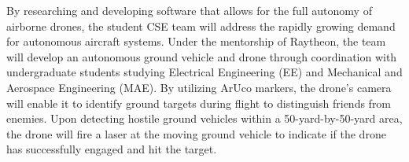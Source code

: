 
By researching and developing software that allows for the full autonomy of airborne drones, the student CSE team will address the rapidly growing demand for autonomous aircraft systems. Under the mentorship of Raytheon, the team will develop an autonomous ground vehicle and drone through coordination with undergraduate students studying Electrical Engineering (EE) and Mechanical and Aerospace Engineering (MAE). By utilizing ArUco markers, the drone's camera will enable it to identify ground targets during flight to distinguish friends from enemies. Upon detecting hostile ground vehicles within a 50-yard-by-50-yard area, the drone will fire a laser at the moving ground vehicle to indicate if the drone has successfully engaged and hit the target.
